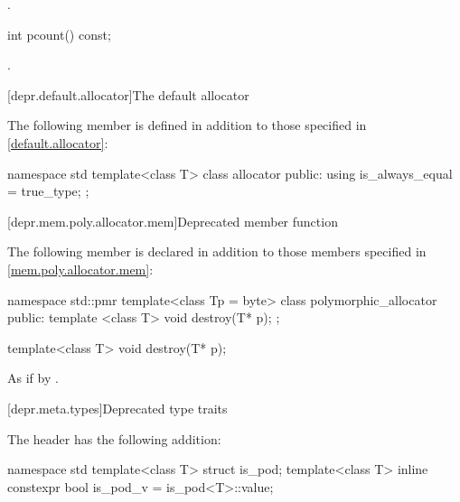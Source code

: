 \begin{itemdescr}
\pnum
\returns
{}.
\end{itemdescr}

%
\begin{itemdecl}
int pcount() const;
\end{itemdecl}

\begin{itemdescr}
\pnum
\returns
{}.
\end{itemdescr}

[depr.default.allocator]{The default allocator}

\pnum
The following member is defined in addition to those
specified in \ref{default.allocator}:

\begin{codeblock}
namespace std {
  template<class T> class allocator {
  public:
    using is_always_equal = true_type;
  };
}
\end{codeblock}

[depr.mem.poly.allocator.mem]{Deprecated  member function}

\pnum
The following member is declared in addition to those members
specified in \ref{mem.poly.allocator.mem}:

\begin{codeblock}
namespace std::pmr {
  template<class Tp = byte>
  class polymorphic_allocator {
  public:
    template <class T>
      void destroy(T* p);
  };
}
\end{codeblock}

%
\begin{itemdecl}
template<class T>
  void destroy(T* p);
\end{itemdecl}

\begin{itemdescr}
\pnum
\effects
As if by .
\end{itemdescr}

[depr.meta.types]{Deprecated type traits}

\pnum
The header 
has the following addition:
%
\begin{codeblock}
namespace std {
  template<class T> struct is_pod;
  template<class T> inline constexpr bool is_pod_v = is_pod<T>::value;
}
\end{codeblock}

